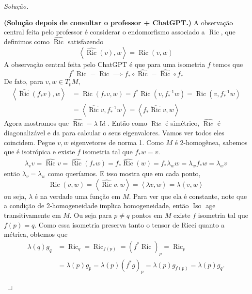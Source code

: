 \begin{proof}[Solução]
\begin{enumerate}[label=(\alph*)]
\textbf{(Solução depois de consultar o professor + ChatGPT.)} A observação central feita pelo professor é considerar o endomorfismo associado a \(\operatorname{Ric}\), que definimos como \(\widehat{\operatorname{Ric}}\) satisfazendo
\[\left<\widehat{\operatorname{Ric}}(v),w\right>=\operatorname{Ric}(v,w)\]
A observação central feita pelo ChatGPT é que para uma isometria \(f\) temos que
\[f^*\operatorname{Ric}=\operatorname{Ric} \implies f_*\circ\widehat{\operatorname{Ric}}=\widehat{\operatorname{Ric}}\circ f_*\]
De fato, para \(v,w \in T_pM\),
\begin{align*}
\left<\widehat{\operatorname{Ric}}(f_*v),w\right>&=\operatorname{Ric}(f_*v,w)=f^*\operatorname{Ric}(v,f_*^{-1}w)=\operatorname{Ric}(v,f_*^{-1}w)\\
&=\left<\widehat{\operatorname{Ric}}v,f_*^{-1}w\right>=\left<f_*\widehat{\operatorname{Ric}}v,w\right>
\end{align*}
Agora mostramos que \(\widehat{\operatorname{Ric}}=\lambda \operatorname{Id}\). Então como \(\operatorname{Ric}\) é simétrico, \(\widehat{\operatorname{Ric}}\) é diagonalizável e da para calcular o seus eigenvalores. Vamos ver todos eles coincidem. Pegue \(v,w\) eigenvetores de norma 1. Como \(M\) é 2-homogênea, sabemos que é isotrópica e existe \(f\) isometria tal que \(f_*w=v\).
\begin{align*}
\lambda_v v=\widehat{\operatorname{Ric}}v=\widehat{\operatorname{Ric}}(f_*w)=f_*\widehat{\operatorname{Ric}}(w)=f_* \lambda_w w=\lambda_w f_* w=\lambda_w v
\end{align*}
então \(\lambda_v=\lambda_w\) como queríamos. E isso mostra que em cada ponto,
\[\operatorname{Ric}(v,w)=\left<\widehat{\operatorname{Ric}}v,w\right>=\left<\lambda v,w\right>=\lambda\left<v,w\right>\]
ou seja, \(\lambda\) é na verdade uma função em \(M\). Para ver que ela é constante, note que a condição de 2-homogeneidade implica homogeneidade, então \(\operatorname{Iso}\) age transitivamente em \(M\). Ou seja para \(p\neq q\) pontos em \(M\) existe \(f\) isometria tal que \(f(p)=q\). Como essa isometria preserva tanto o tensor de Ricci quanto a métrica, obtemos que
\begin{align*}\lambda(q)g_q&=\operatorname{Ric}_q=\operatorname{Ric}_{f(p)}=(f^* \operatorname{Ric})_{p}=\operatorname{Ric}_p\\&=\lambda(p)g_p=\lambda(p) (f^* g)_p=\lambda(p)g_{f(p)}=\lambda(p)g_{q}.
\end{align*}


\end{enumerate}
\end{proof}
